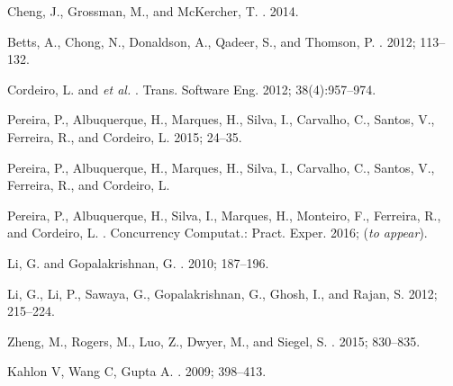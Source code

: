 \documentclass{llncs}
\begin{document}
\begin{thebibliography}{25}

Cheng, J., Grossman, M., and McKercher, T.
.
 2014.


Betts, A., Chong, N., Donaldson, A., Qadeer, S., and Thomson, P.
.
 2012; 113--132.

Cordeiro, L. and {\it et al.} %
.
 Trans. Software Eng. 2012; 38(4):957--974.

Pereira, P., Albuquerque, H., Marques, H., Silva, I., Carvalho, C., Santos, V., Ferreira, R., and Cordeiro, L.
 2015; 24--35.

Pereira, P., Albuquerque, H., Marques, H., Silva, I., Carvalho, C., Santos, V., Ferreira, R., and Cordeiro, L.

Pereira, P., Albuquerque, H., Silva, I., Marques, H., Monteiro, F., Ferreira, R., and Cordeiro, L.
.
\newblock Concurrency Computat.: Pract. Exper. 2016; ({\it to appear}).

Li, G. and Gopalakrishnan, G.
.
 2010; 187--196.

Li, G., Li, P., Sawaya, G., Gopalakrishnan, G., Ghosh, I., and Rajan, S.
 2012; 215--224.

Zheng, M., Rogers, M., Luo, Z., Dwyer, M., and Siegel, S.
.
 2015; 830--835.

Kahlon V, Wang C, Gupta A.
.
 2009; 398--413.


\end{thebibliography}
\end{document}
